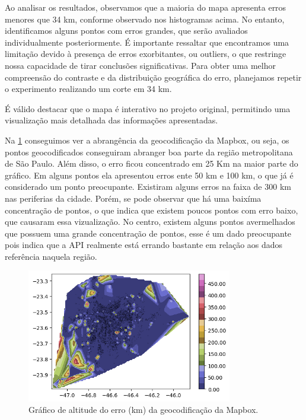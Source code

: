 Ao analisar os resultados, observamos que a maioria do mapa apresenta erros menores que 34 km, conforme observado nos histogramas acima. No entanto, identificamos alguns pontos com erros grandes, que serão avaliados individualmente posteriormente. É importante ressaltar que encontramos uma limitação devido à presença de erros exorbitantes, ou outliers, o que restringe nossa capacidade de tirar conclusões significativas. Para obter uma melhor compreensão do contraste e da distribuição geográfica do erro, planejamos repetir o experimento realizando um corte em 34 km.

É válido destacar que o mapa é interativo no projeto original, permitindo uma visualização mais detalhada das informações apresentadas.

Na \ref{fig:grafAltM} conseguimos ver a abrangência da geocodificação da Mapbox, ou seja, os pontos geocodificados conseguiram abranger boa parte da região metropolitana de São Paulo. Além disso, o erro ficou concentrado em 25 Km na maior parte do gráfico. Em alguns pontos ela apresentou erros ente 50 km e 100 km, o que já é considerado um ponto preocupante. Existiram alguns erros na faixa de 300 km nas periferias da cidade. Porém, se pode observar que há uma baixíma concentração de pontos, o que indica que existem poucos pontos com erro baixo, que causaram essa vizualização. No centro, existem alguns pontos avermelhados que possuem uma grande concentração de pontos, esse é um dado preocupante pois indica que a API realmente está errando bastante em relação aos dados referência naquela região.

\begin{figure}[h] 
  \centering
  \includegraphics[width=0.8\textwidth]{Figuras/graficoAltPontosMapbox.png}
  \caption{Gráfico de altitude do erro (km) da geocodificação da Mapbox.}
  \label{fig:grafAltM}
\end{figure}

